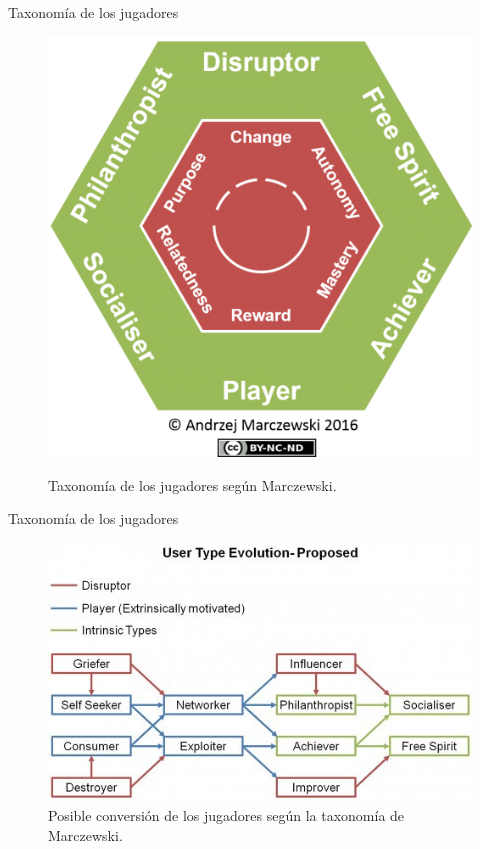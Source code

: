 \documentclass[10pt,notes,compress,usetitleprogressbar,aspectratio=1610]{beamer}
\begin{document}
\begin{frame}{Taxonomía de los jugadores}
	\begin{figure}
		\begin{center}
			\label{fig::Marczewski}
			\includegraphics[scale=0.40]{../img/Marczewski.jpg}	
			\caption{Taxonomía de los jugadores según Marczewski.}
		\end{center}
	\end{figure}
\end{frame}


\begin{frame}{Taxonomía de los jugadores}

\begin{figure}[hbtp]
	\begin{center}
		\includegraphics[scale=0.55]{../img/evolution.jpg}
		\caption{Posible conversión de los jugadores según la taxonomía de Marczewski.}
		\end{center}
	\end{figure}
\end{frame}
\end{document}
